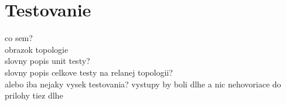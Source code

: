 \chapter{Testovanie}
co sem?\\
 obrazok topologie\\
 slovny popis unit testy?\\
 slovny popis celkove testy na relanej topologii?\\
 alebo iba nejaky vysek testovania?
vystupy by boli dlhe a nic nehovoriace
do prilohy tiez dlhe
